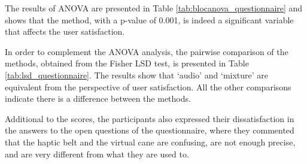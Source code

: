 The results of ANOVA are presented in Table  \ref{tab:blocanova_questionnaire} and shows that the method, with a p-value of 0.001, is indeed a significant variable that affects the user satisfaction.



In order to complement the ANOVA analysis, the pairwise comparison of the methods, obtained from the Fisher LSD test, is presented in Table \ref{tab:lsd_questionnaire}. The results show that ‘audio’ and ‘mixture’ are equivalent from the perspective of user satisfaction. All the other comparisons indicate there is a difference between the methods.



Additional to the scores, the participants also expressed their dissatisfaction in the answers to the open questions of the questionnaire, where they commented that the haptic belt and the virtual cane are confusing, are not enough precise, and are very different from what they are used to.

\FloatBarrier